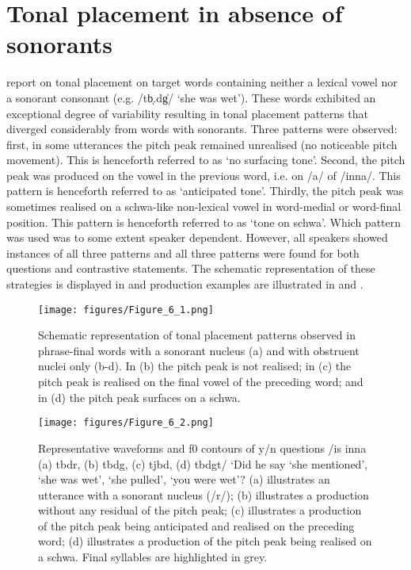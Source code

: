 \section{Tonal placement in absence of sonorants}\label{sec:6.2}
\citet{Grice.etal2015tash} report on tonal placement on target words containing neither a lexical vowel nor a sonorant consonant (e.g. /tb̩.dg̍/ ‘she was wet’). These words exhibited an exceptional degree of variability resulting in tonal placement patterns that diverged considerably from words with sonorants. Three patterns were observed: first, in some utterances the pitch peak remained unrealised (no noticeable pitch movement). This is henceforth referred to as ‘no surfacing tone'. Second, the pitch peak was produced on the vowel in the previous word, i.e. on /a/ of /inna/. This pattern is henceforth referred to as ‘anticipated tone'. Thirdly, the pitch peak was sometimes realised on a schwa-like non-lexical vowel in word-medial or word-final position. This pattern is henceforth referred to as ‘tone on schwa'. Which pattern was used was to some extent speaker dependent. However, all speakers showed instances of all three patterns and all three patterns were found for both questions and contrastive statements. The schematic representation of these strategies is displayed in  and production examples are illustrated in  and .

  \begin{figure}
   \texttt{[image: figures/Figure\_6\_1.png]}
  \caption{Schematic representation of tonal placement patterns observed in phrase-final words with a sonorant nucleus (a) and with obstruent nuclei only (b-d). In (b) the pitch peak is not realised; in (c) the pitch peak is realised on the final vowel of the preceding word; and in (d) the pitch peak surfaces on a schwa. }
   \label{fig:6.1}
   \end{figure}

  \begin{figure}
   \texttt{[image: figures/Figure\_6\_2.png]}
  \caption{Representative waveforms and f0 contours of y/n questions /is inna (a) tbdr, (b) tbdg, (c) tjbd, (d) tbdgt/ ‘Did he say ‘she mentioned’, ‘she was wet’, ‘she pulled’, ‘you were wet’? (a) illustrates an utterance with a sonorant nucleus (/r/); (b) illustrates a production without any residual of the pitch peak; (c) illustrates a production of the pitch peak being anticipated and realised on the preceding word; (d) illustrates a production of the pitch peak being realised on a schwa. Final syllables are highlighted in grey.}
   \label{fig:6.2}
   \end{figure}

